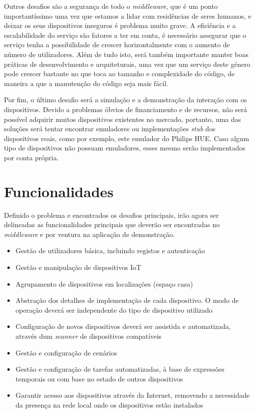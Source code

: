 Outros desafios são a segurança de todo o \textit{middleware}, que é um ponto importantíssimo uma vez que estamos a lidar com residências de seres humanos, e deixar os seus dispositivos inseguros é problema muito grave. A eficiência e a escalabilidade do serviço são fatores a ter em conta, é necessário assegurar que o serviço tenha a possibilidade de crescer horizontalmente com o aumento de número de utilizadores. Além de tudo isto, será também importante manter boas práticas de desenvolvimento e arquiteturais, uma vez que um serviço deste género pode crescer bastante no que toca ao tamanho e complexidade do código, de maneira a que a manutenção do código seja mais fácil.

Por fim, o último desafio será a simulação e a demonstração da interação com os dispositivos. Devido a problemas óbvios de financiamento e de recursos, não será possível adquirir muitos dispositivos existentes no mercado, portanto, uma das soluções será tentar encontrar emuladores ou implementações \textit{stub} dos dispositivos reais, como por exemplo, este \cite{hueemulator} emulador do Philips HUE. Caso algum tipo de dispositivos não possuam emuladores, esses mesmo serão implementados por conta própria.

\section{Funcionalidades}
\label{sec:funcionalidades}

Definido o problema e encontrados os desafios principais, irão agora ser delineadas as funcionalidades principais que deverão ser encontradas no \textit{middleware} e por ventura na aplicação de demonstração.

\begin{itemize}
    \item Gestão de utilizadores básica, incluindo registos e autenticação
    \item Gestão e manipulação de dispositivos IoT
    \item Agrupamento de dispositivos em localizações (espaço casa)
    \item Abstração dos detalhes de implementação de cada dispositivo. O modo de operação deverá ser independente do tipo de dispositivo utilizado
    \item Configuração de novos dispositivos deverá ser assistida e automatizada, através dum \textit{scanner} de dispositivos compatíveis
    \item Gestão e configuração de cenários
    \item Gestão e configuração de tarefas automatizadas, à base de expressões temporais ou com base no estado de outros dispositivos
    \item Garantir acesso aos dispositivos através da Internet, removendo a necessidade da presença na rede local onde os dispositivos estão instalados
\end{itemize}
